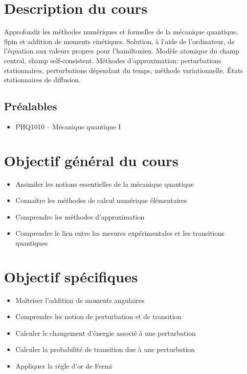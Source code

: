 \documentclass[12pt,undergraduate]{uqtrplandecours}
\begin{document}
\maketitle

\section{Description du cours}

Approfondir les méthodes numériques et formelles de la mécanique quantique.
Spin et addition de moments cinétiques. Solution, à l'aide de l'ordinateur,
  de l'équation aux valeurs propres pour l'hamiltonien.
Modèle atomique du champ central, champ self-consistent.
Méthodes d'approximation: perturbations stationnaires,
  perturbations dépendant du temps, méthode variationnelle.
États stationnaires de diffusion. 


\subsection*{Préalables}
\begin{itemize}
  \item PHQ1010 -- Mécanique quantique I
\end{itemize}



\section{Objectif général du cours}

\begin{itemize}
  \item Assimiler les notions essentielles de la mécanique quantique
  \item Connaître les méthodes de calcul numérique élémentaires
  \item Comprendre les méthodes d'approximation
  \item Comprendre le lien entre les mesures expérimentales
        et les transitions quantiques
\end{itemize}


\section{Objectif spécifiques}

\begin{itemize}
  \item Maîtriser l'addition de moments angulaires
  \item Comprendre les notion de perturbation et de transition
  \item Calculer le changement d'énergie associé à une perturbation
  \item Calculer la probabilité de transition due à une perturbation
  \item Appliquer la règle d'or de Fermi
\end{itemize}
\end{document}
